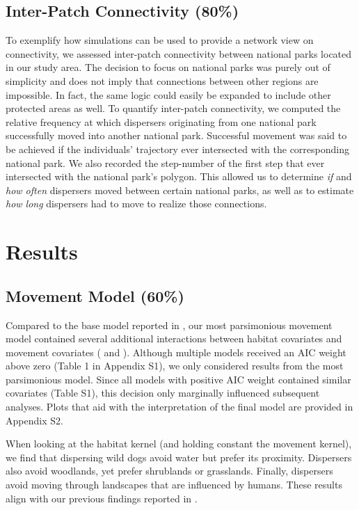 \documentclass[abstract=on,10pt,a4paper,bibliography=totocnumbered]{article}
\begin{document}
\subsection{Inter-Patch Connectivity (80\%)}
To exemplify how simulations can be used to provide a network view on
connectivity, we assessed inter-patch connectivity between national parks
located in our study area. The decision to focus on national parks was purely
out of simplicity and does not imply that connections between other regions are
impossible. In fact, the same logic could easily be expanded to include other
protected areas as well. To quantify inter-patch connectivity, we computed the
relative frequency at which dispersers originating from one national park
successfully moved into another national park. Successful movement was said to
be achieved if the individuals' trajectory ever intersected with the
corresponding national park. We also recorded the step-number of the first step
that ever intersected with the national park's polygon. This allowed us to
determine \textit{if} and \textit{how often} dispersers moved between certain
national parks, as well as to estimate \textit{how long} dispersers had to move
to realize those connections.

\section{Results}
\subsection{Movement Model (60\%)}
Compared to the base model reported in \citep{Hofmann.2021}, our most
parsimonious movement model contained several additional interactions between
habitat covariates and movement covariates ( and
). Although multiple models received an AIC weight
above zero (Table 1 in Appendix S1), we only considered results from the most
parsimonious model. Since all models with positive AIC weight contained similar
covariates (Table S1), this decision only marginally influenced subsequent
analyses. Plots that aid with the interpretation of the final model are provided
in Appendix S2.

When looking at the habitat kernel (and holding constant the movement kernel),
we find that dispersing wild dogs avoid water but prefer its proximity.
Dispersers also avoid woodlands, yet prefer shrublands or grasslands. Finally,
dispersers avoid moving through landscapes that are influenced by humans. These
results align with our previous findings reported in \cite{Hofmann.2021}.
\end{document}
